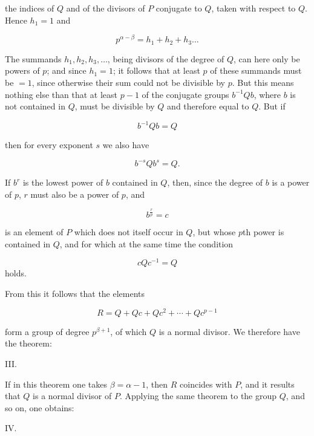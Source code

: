 the indices of $Q$ and of the divisors of $P$ conjugate to $Q$, taken with respect to $Q$. Hence $h_1 = 1$ and

\[
p^{\alpha-\beta} = h_1 + h_2 + h_3 \ldots %
\]

The summands $h_1, h_2, h_3, \ldots$, being divisors of the degree of $Q$, can here only be powers of $p$; and since $h_1 = 1$; it follows that at least $p$ of these summands must be $= 1$, since otherwise their sum could not be divisible by $p$. But this means nothing else than that at least $p - 1$ of the conjugate groups $b^{-1}Qb$, where $b$ is not contained in $Q$, must be divisible by $Q$ and therefore equal to $Q$. But if

\[
b^{-1}Qb = Q
\]

then for every exponent $s$ we also have

\[
b^{-s}Qb^s = Q.
\]

If $b^r$ is the lowest power of $b$ contained in $Q$, then, since the degree of $b$ is a power of $p$, $r$ must also be a power of $p$, and

\[
b^{\frac{r}{p}} = c
\]

is an element of $P$ which does not itself occur in $Q$, but whose $p$th power is contained in $Q$, and for which at the same time the condition

\[
cQc^{-1} = Q
\]
holds.

From this it follows that the elements

\[
R = Q + Qc + Qc^2 + \cdots + Qc^{p-1}
\]

form a group of degree $p^{\beta+1}$, of which $Q$ is a normal divisor. We therefore have the theorem:

III. 

If in this theorem one takes $\beta = \alpha - 1$, then $R$ coincides with $P$, and it results that $Q$ is a normal divisor of $P$. Applying the same theorem to the group $Q$, and so on, one obtains:

IV. 
